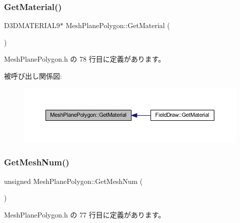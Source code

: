 \subsubsection{\texorpdfstring{Get\+Material()}{GetMaterial()}}
{\footnotesize\ttfamily D3\+D\+M\+A\+T\+E\+R\+I\+A\+L9$\ast$ Mesh\+Plane\+Polygon\+::\+Get\+Material (\begin{DoxyParamCaption}{ }\end{DoxyParamCaption})\hspace{0.3cm}{\ttfamily [inline]}}



 Mesh\+Plane\+Polygon.\+h の 78 行目に定義があります。

被呼び出し関係図\+:\nopagebreak
\begin{figure}[H]
\begin{center}
\leavevmode
\includegraphics[width=350pt]{class_mesh_plane_polygon_a1188cf0072e000227ecce6210ba2778c_icgraph}
\end{center}
\end{figure}
\mbox{\label{class_mesh_plane_polygon_a42d1d92dea7878cf59d418aa7ab5106d}} 
\subsubsection{\texorpdfstring{Get\+Mesh\+Num()}{GetMeshNum()}}
{\footnotesize\ttfamily unsigned Mesh\+Plane\+Polygon\+::\+Get\+Mesh\+Num (\begin{DoxyParamCaption}{ }\end{DoxyParamCaption})\hspace{0.3cm}{\ttfamily [inline]}}



 Mesh\+Plane\+Polygon.\+h の 77 行目に定義があります。

